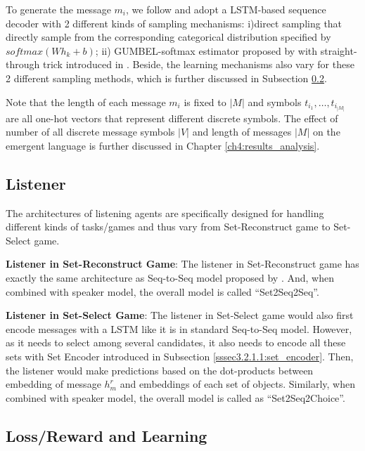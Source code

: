 To generate the message $m_i$, we follow \cite{havrylov2017emergence} and adopt a LSTM-based sequence decoder with 2 different kinds of sampling mechanisms: i)direct sampling that directly sample from the corresponding categorical distribution specified by $softmax(Wh_k + b)$; ii) GUMBEL-softmax estimator proposed by \cite{jang2016categorical} with straight-through trick introduced in \cite{bengio2013estimating}. Beside, the learning mechanisms also vary for these 2 different sampling methods, which is further discussed in Subsection \ref{ssec3.2.3:loss_learning}.

Note that the length of each message $m_i$ is fixed to $|M|$ and symbols $t_{i_1},\dots,t_{i_|M|}$ are all one-hot vectors that represent different discrete symbols. The effect of number of all discrete message symbols $|V|$ and length of messages $|M|$ on the emergent language is further discussed in Chapter \ref{ch4:results_analysis}.

\subsection{Listener}
\label{ssec3.2.2:listeners}

The architectures of listening agents are specifically designed for handling different kinds of tasks/games and thus vary from Set-Reconstruct game to Set-Select game.

\noindent\textbf{Listener in Set-Reconstruct Game}: The listener in Set-Reconstruct game has exactly the same architecture as Seq-to-Seq model proposed by \cite{sutskever2014sequence}. And, when combined with speaker model, the overall model is called ``Set2Seq2Seq''.

\noindent\textbf{Listener in Set-Select Game}: The listener in Set-Select game would also first encode messages with a LSTM like it is in standard Seq-to-Seq model. However, as it needs to select among several candidates, it also needs to encode all these sets with Set Encoder introduced in Subsection \ref{sssec3.2.1.1:set_encoder}. Then, the listener would make predictions based on the dot-products between embedding of message $h^r_m$ and embeddings of each set of objects. Similarly, when combined with speaker model, the overall model is called as ``Set2Seq2Choice''.

\subsection{Loss/Reward and Learning}
\label{ssec3.2.3:loss_learning}

